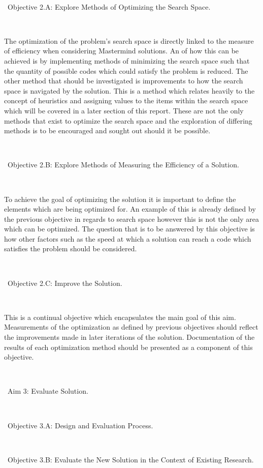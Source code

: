 \documentclass[12pt]{article}  %
\theoremstyle{definition}
\theoremstyle{remark}
\begin{document}
\

\textbullet\ Objective 2.A: Explore Methods of Optimizing the Search Space.

\

The optimization of the problem's search space is directly linked to the measure of efficiency when considering Mastermind solutions. An of how this can be achieved is by implementing methods of minimizing the search space such that the quantity of possible codes which could satisfy the problem is reduced. The other method that should be investigated is improvements to how the search space is navigated by the solution. This is a method which relates heavily to the concept of heuristics and assigning values to the items within the search space which will be covered in a later section of this report. These are not the only methods that exist to optimize the search space and the exploration of differing methods is to be encouraged and sought out should it be possible.

\

\textbullet\ Objective 2.B: Explore Methods of Measuring the Efficiency of a Solution.

\

To achieve the goal of optimizing the solution it is important to define the elements which are being optimized for. An example of this is already defined by the previous objective in regards to search space however this is not the only area which can be optimized. The question that is to be answered by this objective is how other factors such as the speed at which a solution can reach a code which satisfies the problem should be considered.

\

\textbullet\ Objective 2.C: Improve the Solution.

\

This is a continual objective which encapsulates the main goal of this aim. Measurements of the optimization as defined by previous objectives should reflect the improvements made in later iterations of the solution. Documentation of the results of each optimization method should be presented as a component of this objective.

\

\textbullet\ Aim 3: Evaluate Solution.

\

\textbullet\ Objective 3.A: Design and Evaluation Process.

\

\textbullet\ Objective 3.B: Evaluate the New Solution in the Context of Existing Research.
\end{document}
